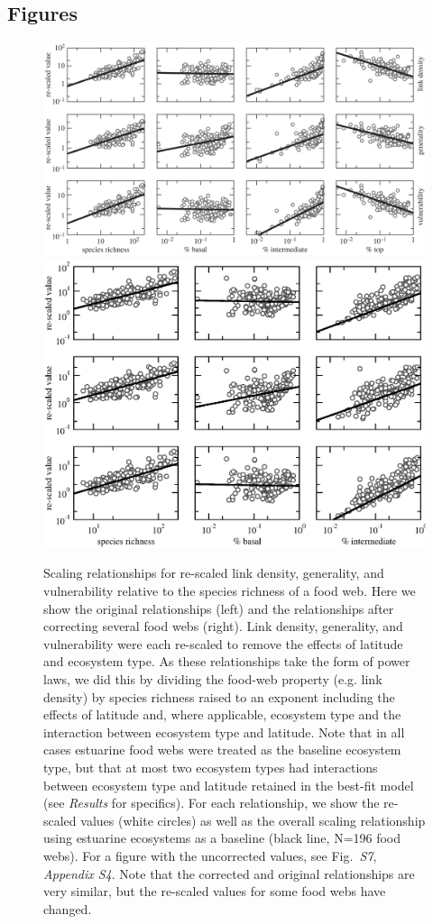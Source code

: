 \documentclass[12pt]{article}
\begin{document}
\begin{spacing}{2.0}
% 
% 

\clearpage

\section*{Figures}

\setcounter{figure}{1}

\begin{figure}[h]
\includegraphics*[width=.48\textwidth]{Figures/Figure2.eps}
\hspace{.02\textwidth}
\includegraphics*[width=.48\textwidth]{Figures/Figure2_updated.eps}

\caption{Scaling relationships for re-scaled link density, generality, and vulnerability 
relative to the species richness of a food web. Here we show the original relationships (left)
and the relationships after correcting several food webs (right). Link density, generality,
and vulnerability were each re-scaled to remove the effects of latitude and ecosystem
type. As these relationships take the form of power laws, we did this by dividing the food-web
property (e.g. link density) by species richness raised to an exponent including the 
effects of latitude and, where applicable, ecosystem type and the interaction between ecosystem
type and latitude. Note that in all cases estuarine food webs were treated as the baseline 
ecosystem type, but that at most two ecosystem types had interactions between ecosystem type and
latitude retained in the best-fit model (see \emph{Results} for specifics). For each relationship, 
we show the re-scaled values (white circles) as well as the overall scaling relationship using estuarine
ecosystems as a baseline (black line, N=196 food webs). For a figure with the uncorrected values,
see Fig.~\emph{S7}, \emph{Appendix S4}. Note that the corrected and original relationships are 
very similar, but the re-scaled values for some food webs have changed.
}
\label{props_v_lat1}
\end{figure}



\end{spacing}
\end{document}
